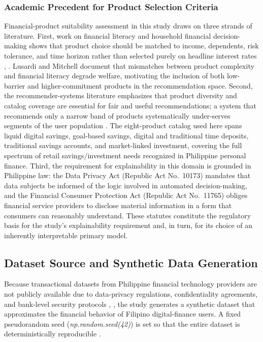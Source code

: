 \documentclass{icsthesis}
\begin{document}
\begin{mainmatter}
				\subsubsection{Academic Precedent for Product Selection Criteria}
					Financial-product suitability assessment in this study draws on three strands of literature. First, work on financial literacy and household financial decision-making shows that product choice should be matched to income, dependents, risk tolerance, and time horizon rather than selected purely on headline interest rates \cite{ref43}, \cite{ref55}. Lusardi and Mitchell \cite{ref43} document that mismatches between product complexity and financial literacy degrade welfare, motivating the inclusion of both low-barrier and higher-commitment products in the recommendation space. Second, the recommender-systems literature emphasizes that product diversity and catalog coverage are essential for fair and useful recommendations; a system that recommends only a narrow band of products systematically under-serves segments of the user population \cite{ref13}. The eight-product catalog used here spans liquid digital savings, goal-based savings, digital and traditional time deposits, traditional savings accounts, and market-linked investment, covering the full spectrum of retail savings/investment needs recognized in Philippine personal finance. Third, the requirement for explainability in this domain is grounded in Philippine law: the Data Privacy Act (Republic Act No.~10173) \cite{ref45} mandates that data subjects be informed of the logic involved in automated decision-making, and the Financial Consumer Protection Act (Republic Act No.~11765) \cite{ref44} obliges financial service providers to disclose material information in a form that consumers can reasonably understand. These statutes constitute the regulatory basis for the study's explainability requirement and, in turn, for its choice of an inherently interpretable primary model.

			\subsection{Dataset Source and Synthetic Data Generation}
				Because transactional datasets from Philippine financial technology providers are not publicly available due to data-privacy regulations, confidentiality agreements, and bank-level security protocols \cite{ref45}, \cite{ref46}, the study generates a synthetic dataset that approximates the financial behavior of Filipino digital-finance users. A fixed pseudorandom seed (\emph{np.random.seed(42)}) is set so that the entire dataset is deterministically reproducible \cite{ref60}.


\end{mainmatter}
\end{document}
